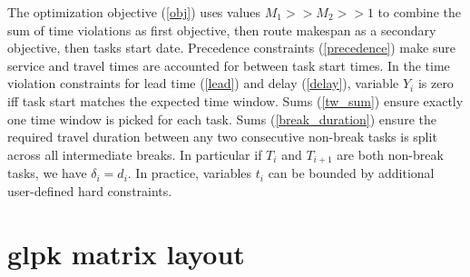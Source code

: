 \documentclass{article}
\begin{document}
The optimization objective (\ref{obj}) uses values $M_1 >> M_2 >> 1$
to combine the sum of time violations as first objective, then route
makespan as a secondary objective, then tasks start date. Precedence
constraints (\ref{precedence}) make sure service and travel times are
accounted for between task start times. In the time violation
constraints for lead time (\ref{lead}) and delay (\ref{delay}),
variable $Y_i$ is zero iff task start matches the expected time
window. Sums (\ref{tw_sum}) ensure exactly one time window is picked
for each task. Sums (\ref{break_duration}) ensure the required travel
duration between any two consecutive non-break tasks is split across
all intermediate breaks. In particular if $T_i$ and $T_{i + 1}$ are
both non-break tasks, we have $\delta_i = d_i$. In practice, variables
$t_i$ can be bounded by additional user-defined hard constraints.

\section{glpk matrix layout}

\setcounter{MaxMatrixCols}{30}
\end{document}
